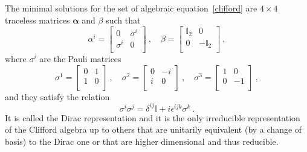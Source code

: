     The minimal solutions for the set of algebraic equation~\eqref{clifford} are $4 \times 4$ traceless matrices $\boldsymbol \alpha$ and $\beta$ such that
    \begin{equation*}
        \alpha^i = \begin{bmatrix}
            0 & \sigma^i \\ 
            \sigma^i & 0 \\
        \end{bmatrix} ~, \quad \beta = 
        \begin{bmatrix}
            \mathbb I_2 & 0 \\
            0 & - \mathbb I_2 \\
        \end{bmatrix} ~, 
    \end{equation*}
    where $\sigma^i$ are the Pauli matrices 
    \begin{equation*}
        \sigma^1 = \begin{bmatrix} 0 & 1 \\ 1 & 0 \\ \end{bmatrix} ~,
        \quad \sigma^2 = \begin{bmatrix} 0 & -i \\ i & 0 \\ \end{bmatrix} ~,
        \quad \sigma^3 = \begin{bmatrix} 1 & 0 \\ 0 & -1 \\ \end{bmatrix} ~,
    \end{equation*}
    and they satisfy the relation 
    \begin{equation*}
        \sigma^i \sigma^j = \delta^{ij} \mathbb I + i \epsilon^{ijk} \sigma^k ~.
    \end{equation*}
    It is called the Dirac representation and it is the only irreducible representation of the Clifford algebra up to others that are unitarily equivalent (by a change of basis) to the Dirac one or that are higher dimensional and thus reducible.

